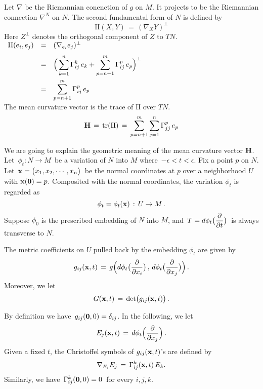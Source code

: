 \documentclass{article}[12pt,a4paper]
\begin{document}
Let $\nabla$ be the Riemannian conenction of $g$ on $M$. 
It projects to be the Riemannian connection $\nabla^N$ on $N$. 
The second fundamental form of $N$ is defined by
\begin{equation}
\mbox{II}(X, Y) \,=\, (\nabla_X Y)^\perp
\end{equation}
Here $Z^\perp$ denotes the orthogonal component of $Z$ to $TN$. \\[0.1in]
$\begin{array}{rcl}
\mbox{II}(e_i, e_j) &=& (\nabla_{e_i}e_j)^\perp \\[0.1in]
&=& \displaystyle 
	\Big(\sum_{k=1}^n \Gamma_{ij}^k\, e_k 
	+ \sum_{p=n+1}^m \Gamma_{ij}^p\, e_p \Big)^\perp \\[0.2in]
&=& \displaystyle 
	\sum_{p=n+1}^m \Gamma_{ij}^p\, e_p \\
\end{array}$ \\[0.2in]

The mean curvature vector is the trace of $\mbox{II}$ over $TN$.
\begin{equation}
{\bf H} \,=\, \mbox{tr}(\mbox{II}) \,=\, \sum_{p=n+1}^m \sum_{j=1}^n \Gamma_{jj}^p\, e_p 
\end{equation}
\vspace*{0.1in}

We are going to explain the geometric meaning of the mean curvature vector ${\bf H}$. \\

Let \,$\phi_t: N \to M$\, be a variation of $N$ into $M$ where \,$-\epsilon<t<\epsilon$.
Fix a point $p$ on $N$. Let \,${\bf x} = \big(x_1, x_2, \cdots, x_n\big)$\,
be the normal coordinates at $p$ over a neighborhood $U$ with ${\bf x}({\bf 0})=p$. 
Composited with the normal coordinates, the variation $\phi_t$ is regarded as
$$ \phi_t = \phi_t({\bf x}) \,:\, U \to M \,.$$
Suppose $\phi_0$ is the prescribed embedding of $N$ into $M$, 
and \,$\displaystyle T=d\phi_t\big(\frac{\partial}{\partial t}\big)$\, is always transverse to $N$.  \\
\newpage

The metric coefficients on $U$ pulled back by the embedding $\phi_t$ are given by
$$ g_{ij}({\bf x}, t) \,=\, g\Big(d\phi_t \big(\frac{\partial}{\partial x_i}\big)\,,\,
	d\phi_t \big(\frac{\partial}{\partial x_j}\big)\Big)\,. $$
Moreover, we let
$$ G({\bf x}, t) \,=\, \mbox{det}\big(g_{ij}({\bf x}, t)\big)\,.$$

By definition we have \,$g_{ij}({\bf 0}, 0)=\delta_{ij}$. In the following, we let
$$ E_j({\bf x}, t) \,=\, d\phi_t \Big(\frac{\partial}{\partial x_j}\Big)\,. $$ 
Given a fixed $t$, the Christoffel symbols of $g_{ij}({\bf x}, t)$'s are defined by
$$ \nabla_{E_i} E_j \,=\, \Gamma_{ij}^k({\bf x}, t)\, E_k. $$
Similarly, we have \,$\Gamma_{ij}^k({\bf 0}, 0) = 0$\, for every $i,j,k$. \\[0.1in]
\end{document}
